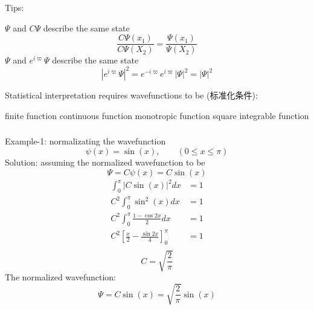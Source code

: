 \begin{frame}
    \frametitle{}
    \alert{Tips:}
    \begin{itemize}
        \Item $\Psi$ and $C\Psi$ describe the same state 
        \[ \frac{C\Psi(x_1)}{C\Psi(X_2)} = \frac{\Psi(x_1)}{\Psi(X_2)}\]
        \Item $\Psi$ and $e^{i\varpi}\Psi$ describe the same state 
         \[ |e^{i\varpi}\Psi|^2 = e^{-i\varpi} e^{i\varpi} |\Psi|^2 = |\Psi|^2 \] 
    \end{itemize}  
\end{frame}

\begin{frame}
    Statistical interpretation requires wavefunctions to be (标准化条件):
    \begin{itemize}
        \Item finite  function
        \Item continuous function 
        \Item monotropic function
        \Item square integrable function 
    \end{itemize}
\end{frame}

\begin{frame}[allowframebreaks=]
    \frametitle{}
    \alert{Example-1:} normalizating the wavefunction \[\psi(x)=\sin(x), \qquad (0\le x \le \pi)\]
    \alert{Solution:} assuming the normalized wavefunction to be 
    \[\Psi=C\psi(x)=C\sin(x)\]
    \begin{equation*}
        \begin{split}
            \int_0 ^\pi |C\sin(x)|^2 dx &=1 \\
            C^2 \int_0 ^\pi \sin^2(x) dx &=1 \\
            C^2 \int_0 ^\pi \frac{1-\cos 2x }{2} dx &=1 \\ 
            C^2 [\frac{x}{2}-\frac{\sin 2x}{4}]_0 ^\pi &=1 \\ 
        \end{split} 
     \end{equation*}
     \[C=\sqrt{\frac{2}{\pi}}\]
     The normalized wavefunction:
     \begin{equation*}
        \Psi=C\sin(x)=\sqrt{\frac{2}{\pi}}\sin(x)
    \end{equation*}
\end{frame}

